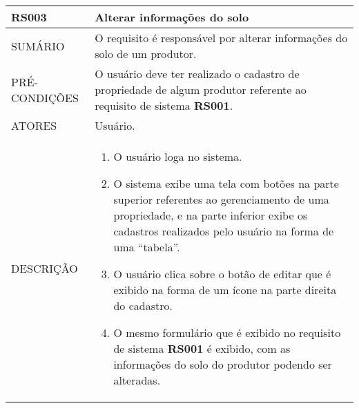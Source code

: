 \begin{longtable}[c]{@{}|p{4cm}|p{9cm}|@{}}
\hline
\begin{minipage}[t]{0.47\columnwidth}
\textbf{RS003}
\end{minipage} & \begin{minipage}[t]{0.47\columnwidth}
Alterar informações do solo
\end{minipage}
\\\hline
\begin{minipage}[t]{0.47\columnwidth}
SUMÁRIO
\end{minipage} & \begin{minipage}[t]{0.47\columnwidth}
O requisito é responsável por alterar informações do solo de um
produtor.
\end{minipage}
\\\hline
\begin{minipage}[t]{0.47\columnwidth}
PRÉ-CONDIÇÕES
\end{minipage} & \begin{minipage}[t]{0.47\columnwidth}
O usuário deve ter realizado o cadastro de propriedade de algum produtor
referente ao requisito de sistema \textbf{RS001}.
\end{minipage}
\\\hline
\begin{minipage}[t]{0.47\columnwidth}
ATORES
\end{minipage} & \begin{minipage}[t]{0.47\columnwidth}
Usuário.
\end{minipage}
\\\hline
\begin{minipage}[t]{0.47\columnwidth}
DESCRIÇÃO
\end{minipage} & \begin{minipage}[t]{0.47\columnwidth}
\begin{enumerate}
\def\labelenumi{\arabic{enumi}.}
\itemsep1pt\parskip0pt\parsep0pt
\item
  O usuário loga no sistema.
\item
  O sistema exibe uma tela com botões na parte superior referentes ao
  gerenciamento de uma propriedade, e na parte inferior exibe os
  cadastros realizados pelo usuário na forma de uma ``tabela''.
\item
  O usuário clica sobre o botão de editar que é exibido na forma de um
  ícone na parte direita do cadastro.
\item
  O mesmo formulário que é exibido no requisito de sistema \textbf{RS001} é
  exibido, com as informações do solo do produtor podendo ser alteradas.

\end{enumerate}
\end{minipage}
\end{longtable}
